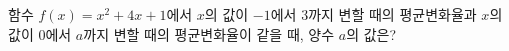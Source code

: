 함수 $f(x)=x^2+4x+1$에서 $x$의 값이 $-1$에서 $3$까지 변할 때의 평균변화율과 $x$의 값이 $0$에서 $a$까지 변할 때의 평균변화율이 같을 때, 양수 $a$의 값은?
